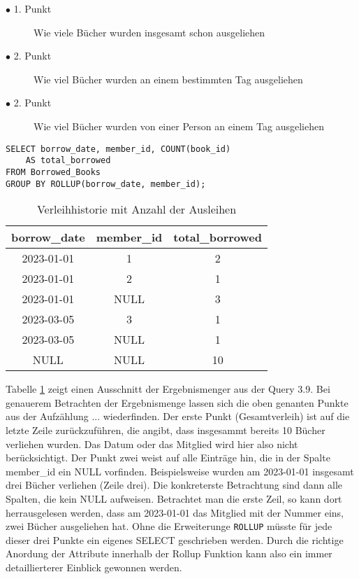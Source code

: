 \begin{description}
	\item[$\bullet$ 1. Punkt] Wie viele Bücher wurden insgesamt schon ausgeliehen

	\item[$\bullet$ 2. Punkt] Wie viel Bücher wurden an einem bestimmten Tag ausgeliehen

	\item[$\bullet$ 2. Punkt] Wie viel Bücher wurden von einer Person an einem Tag
		ausgeliehen
\end{description}

\begin{lstlisting}
SELECT borrow_date, member_id, COUNT(book_id)
	AS total_borrowed
FROM Borrowed_Books
GROUP BY ROLLUP(borrow_date, member_id);
\end{lstlisting}

\begin{table}[h]
	\centering
	\begin{tabular}{|c|c|c|}
		\hline
		\textbf{borrow\_date} & \textbf{member\_id} & \textbf{total\_borrowed} \\
		\hline
		2023-01-01            & 1                   & 2                        \\ %
		\hline
		2023-01-01            & 2                   & 1                        \\ %
		\hline
		2023-01-01            & NULL                & 3                        \\ %
		\hline
		2023-03-05            & 3                   & 1                        \\
		\hline
		2023-03-05            & NULL                & 1                        \\
		\hline
		NULL                  & NULL                & 10                       \\
		\hline
	\end{tabular}
	\caption{Verleihhistorie mit Anzahl der Ausleihen}
	\label{tab:borrow_history}
\end{table}

Tabelle \ref{tab:borrow_history} zeigt einen Ausschnitt der Ergebnismenger aus der
Query 3.9. Bei genauerem Betrachten der Ergebnismenge lassen sich die oben
genanten Punkte aus der Aufzählung ... wiederfinden. Der erste Punkt (Gesamtverleih)
ist auf die letzte Zeile zurückzuführen, die angibt, dass insgesammt bereits 10 Bücher
verliehen wurden. Das Datum oder das Mitglied wird hier also nicht
berücksichtigt. Der Punkt zwei weist auf alle Einträge hin, die in der Spalte
member\_id ein NULL vorfinden. Beispielsweise wurden am 2023-01-01 insgesamt drei
Bücher verliehen (Zeile drei). Die konkreterste Betrachtung sind dann alle
Spalten, die kein NULL aufweisen. Betrachtet man die erste Zeil, so kann dort herrausgelesen
werden, dass am 2023-01-01 das Mitglied mit der Nummer eins, zwei Bücher ausgeliehen
hat. Ohne die Erweiterunge \texttt{ROLLUP} müsste für jede dieser drei Punkte ein
eigenes SELECT geschrieben werden. Durch die richtige Anordung der Attribute
innerhalb der Rollup Funktion kann also ein immer detaillierterer Einblick
gewonnen werden.

